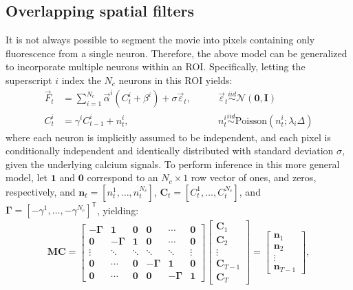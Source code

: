 \documentclass{article}
\providecommand{\ve}[1]{\boldsymbol{#1}}
\newcommand{\T}{^{\ensuremath{\mathsf{T}}}}           %
\newcommand{\bb}{\ve{b}}
\newcommand{\bn}{\ve{n}}
\newcommand{\bC}{\ve{C}}
\newcommand{\bI}{\ve{I}}
\newcommand{\vF}{\vec{F}}
\newcommand{\Del}{\Delta}
\newcommand{\sig}{\sigma}
\newcommand{\lam}{\lambda}
\newcommand{\gam}{\gamma}
\newcommand{\bGam}{\ve{\Gamma}}
\newcommand{\valpha}{\vec{\alpha}}
\begin{document}
\subsection{Overlapping spatial filters} \label{sec:methods:overlapping}

It is not always possible to segment the movie into pixels containing only fluorescence from a single neuron.  Therefore, the above model can be generalized to incorporate multiple neurons within an ROI.   Specifically, letting the superscript $i$ index the $N_c$ neurons in this ROI yields:  
\begin{align} \label{eq:overlapping}
\vF_t &= \sum_{i=1}^{N_c}\valpha^i (C^i_t + \beta^i) +  \sig\vec{\varepsilon}_t, \qquad &\vec{\varepsilon}_t \overset{iid}{\sim} \mathcal{N}(\ve{0},\bI)   \\
C^i_t &= \gam^i C^i_{t-1} + n^i_t, & n^i_t \overset{iid}{\sim} \text{Poisson}(n^i_t; \lam_i \Del)
\end{align}
\noindent where each neuron is implicitly assumed to be independent, and each pixel is conditionally independent and identically distributed with standard deviation $\sig$, given the underlying calcium signals.  To perform inference in this more general model, let $\ve{1}$ and $\ve{0}$ correspond to an $N_c \times 1$ row vector of ones, and zeros, respectively, and $\bn_t=[n^1_t, \ldots, n^{N_c}_t]$, $\bC_t=[C^1_t, \ldots, C^{N_c}_t]$, and $\bGam=[-\gam^1, \ldots, -\gam^{N_c}]\T$, yielding:
\begin{align} \label{eq:M2}
\ve{M} \bC = %
\begin{bmatrix}
-\bGam & \ve{1} & \ve{0} & \ve{0} & \cdots & \ve{0} \\
\ve{0} & -\bGam & \ve{1} & \ve{0} & \cdots  & \ve{0} \\
\vdots & \ddots & \ddots & \ddots & \ddots & \vdots  \\
\ve{0} & \cdots & \ve{0}  & -\bGam & \ve{1} & \ve{0} \\
\ve{0} & \cdots & \ve{0} & \ve{0} & -\bGam & \ve{1}
\end{bmatrix}
\begin{bmatrix}
\bC_1 \\ \bC_2  \\  \vdots \\ \bC_{T-1} \\ \bC_T  
\end{bmatrix}
= 
\begin{bmatrix}
\bn_1 \\ \bn_2 \\ \vdots \\ \bn_{T-1}
\end{bmatrix}
,%
\end{align}
\end{document}
